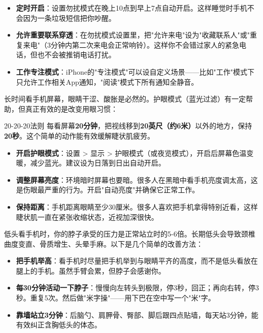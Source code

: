 \begin{itemize}
  \item \textbf{定时开启}：设置勿扰模式在晚上10点到早上7点自动开启。这样睡觉时手机不会因为一条垃圾短信把你吵醒。
  \item \textbf{允许重要联系穿透}：在勿扰模式设置里，把"允许来电"设为"收藏联系人"或"重复来电"（3分钟内第二次来电会正常响铃）。这样你不会错过家人的紧急电话，但也不会被推销电话打扰。
  \item \textbf{工作专注模式}：iPhone的"专注模式"可以设自定义场景——比如"工作"模式下只允许工作相关App通知，"阅读"模式下所有通知全静音。
\end{itemize}


长时间看手机屏幕，眼睛干涩、酸胀是必然的。护眼模式（蓝光过滤）有一定帮助，但真正有效的是改变用眼习惯：

\begin{tcbinfo}{20-20-20法则}
每看屏幕\textbf{20分钟}，把视线移到\textbf{20英尺（约6米）}以外的地方，保持\textbf{20秒}。这个简单的动作能有效缓解睫状肌疲劳。

\end{tcbinfo}

\begin{itemize}
  \item \textbf{开启护眼模式}：设置 > 显示 > 护眼模式（或夜览模式），开启后屏幕色温变暖，减少蓝光。建议设为日落到日出自动开启。
  \item \textbf{调整屏幕亮度}：环境暗时屏幕也要暗。很多人在黑暗中看手机亮度调太高，这是伤眼最严重的行为。开启"自动亮度"并确保它正常工作。
  \item \textbf{保持距离}：手机距离眼睛至少30厘米。很多人喜欢把手机拿得特别近看，这样睫状肌一直在紧张收缩状态，近视加深很快。
\end{itemize}


低头看手机时，你的脖子承受的压力是正常站立时的5-6倍。长期低头会导致颈椎曲度变直、骨质增生、头晕手麻。以下是几个简单的改善方法：

\begin{itemize}
  \item \textbf{把手机举高}：看手机时尽量把手机举到与眼睛平齐的高度，而不是低头看放在腿上的手机。虽然手臂会累，但脖子会感谢你。
  \item \textbf{每30分钟活动一下脖子}：慢慢向左转头到极限，停3秒，回正；再向右转，停3秒。重复5次。然后做"米字操"——用下巴在空中写一个"米"字。
  \item \textbf{靠墙站立3分钟}：后脑勺、肩胛骨、臀部、脚后跟四点贴墙，每天站3分钟，能有效纠正含胸低头的体态。
\end{itemize}

